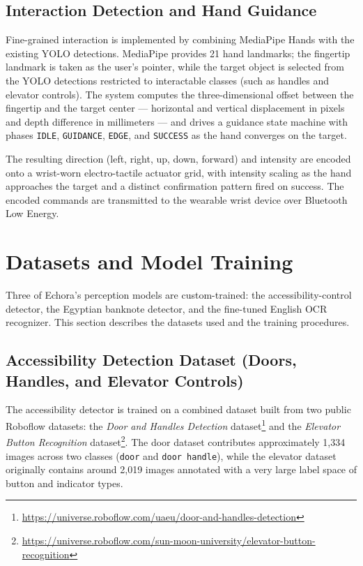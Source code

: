 \subsection{Interaction Detection and Hand Guidance}

Fine-grained interaction is implemented by combining MediaPipe Hands with the existing YOLO detections. MediaPipe provides 21 hand landmarks; the fingertip landmark is taken as the user's pointer, while the target object is selected from the YOLO detections restricted to interactable classes (such as handles and elevator controls). The system computes the three-dimensional offset between the fingertip and the target center --- horizontal and vertical displacement in pixels and depth difference in millimeters --- and drives a guidance state machine with phases \texttt{IDLE}, \texttt{GUIDANCE}, \texttt{EDGE}, and \texttt{SUCCESS} as the hand converges on the target.

The resulting direction (left, right, up, down, forward) and intensity are encoded onto a wrist-worn electro-tactile actuator grid, with intensity scaling as the hand approaches the target and a distinct confirmation pattern fired on success. The encoded commands are transmitted to the wearable wrist device over Bluetooth Low Energy.

\section{Datasets and Model Training}
\label{sec:datasets}

Three of Echora's perception models are custom-trained: the accessibility-control detector, the Egyptian banknote detector, and the fine-tuned English OCR recognizer. This section describes the datasets used and the training procedures.

\subsection{Accessibility Detection Dataset (Doors, Handles, and Elevator Controls)}

The accessibility detector is trained on a combined dataset built from two public Roboflow datasets: the \emph{Door and Handles Detection} dataset\footnote{\url{https://universe.roboflow.com/uaeu/door-and-handles-detection}} and the \emph{Elevator Button Recognition} dataset\footnote{\url{https://universe.roboflow.com/sun-moon-university/elevator-button-recognition}}. The door dataset contributes approximately 1,334 images across two classes (\texttt{door} and \texttt{door handle}), while the elevator dataset originally contains around 2,019 images annotated with a very large label space of button and indicator types.

